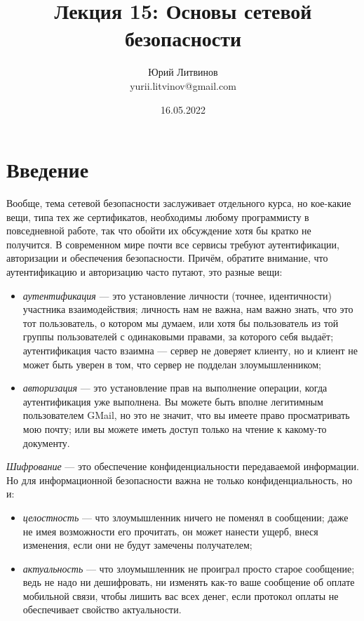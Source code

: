 \documentclass[a5paper]{article}
\title{Лекция 15: Основы сетевой безопасности}
\author{Юрий Литвинов\\\small{yurii.litvinov@gmail.com}}
\date{16.05.2022}
\begin{document}
\maketitle
\thispagestyle{empty}

\section{Введение}

Вообще, тема сетевой безопасности заслуживает отдельного курса, но кое-какие вещи, типа тех же сертификатов, необходимы любому программисту в повседневной работе, так что обойти их обсуждение хотя бы кратко не получится. В современном мире почти все сервисы требуют аутентификации, авторизации и обеспечения безопасности. Причём, обратите внимание, что аутентификацию и авторизацию часто путают, это разные вещи:

\begin{itemize}
    \item \textit{аутентификация} --- это установление личности (точнее, идентичности) участника взаимодействия; личность нам не важна, нам важно знать, что это тот пользователь, о котором мы думаем, или хотя бы пользователь из той группы пользователей с одинаковыми правами, за которого себя выдаёт; аутентификация часто взаимна --- сервер не доверяет клиенту, но и клиент не может быть уверен в том, что сервер не подделан злоумышленником;
    \item \textit{авторизация} --- это установление прав на выполнение операции, когда аутентификация уже выполнена. Вы можете быть вполне легитимным пользователем GMail, но это не значит, что вы имеете право просматривать мою почту; или вы можете иметь доступ только на чтение к какому-то документу.
\end{itemize}

\textit{Шифрование} --- это обеспечение конфиденциальности передаваемой информации. Но для информационной безопасности важна не только конфиденциальность, но и:

\begin{itemize}
    \item \textit{целостность} --- что злоумышленник ничего не поменял в сообщении; даже не имея возможности его прочитать, он может нанести ущерб, внеся изменения, если они не будут замечены получателем;
    \item \textit{актуальность} --- что злоумышленник не проиграл просто старое сообщение; ведь не надо ни дешифровать, ни изменять как-то ваше сообщение об оплате мобильной связи, чтобы лишить вас всех денег, если протокол оплаты не обеспечивает свойство актуальности.
\end{itemize}
\end{document}
